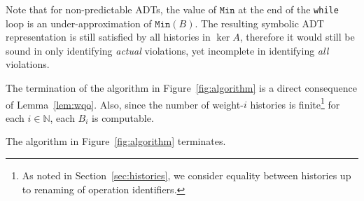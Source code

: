 \begin{remark}
Note that for non-predictable ADTs, the value of $\texttt{Min}$ at the end of the \texttt{while} loop
is an under-approximation of $\texttt{Min}(B)$.
The resulting symbolic ADT representation is still satisfied by all histories in $\ker A$, therefore it would still be sound in only identifying
\emph{actual} violations, yet incomplete in identifying \emph{all} violations.
\end{remark}

The termination of the algorithm in Figure~\ref{fig:algorithm} is a direct consequence of Lemma~\ref{lem:wqo}.
Also, since the number of weight-$i$ histories is finite\footnote{As
noted in Section~\ref{sec:histories}, we consider equality between histories up
to renaming of operation identifiers.} for each $i \in \mathbb{N}$, each $B_i$
is computable.


\begin{theorem}\label{th:corr2}
The algorithm in Figure~\ref{fig:algorithm} terminates.
\end{theorem}
